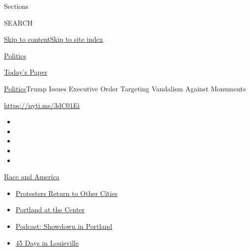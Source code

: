 Sections

SEARCH

\protect\hyperlink{site-content}{Skip to
content}\protect\hyperlink{site-index}{Skip to site index}

\href{https://www.nytimes.com/section/politics}{Politics}

\href{https://myaccount.nytimes.com/auth/login?response_type=cookie\&client_id=vi}{}

\href{https://www.nytimes.com/section/todayspaper}{Today's Paper}

\href{/section/politics}{Politics}\textbar{}Trump Issues Executive Order
Targeting Vandalism Against Monuments

\url{https://nyti.ms/3dC01Ei}

\begin{itemize}
\item
\item
\item
\item
\item
\end{itemize}

\href{https://www.nytimes.com/news-event/george-floyd-protests-minneapolis-new-york-los-angeles?action=click\&pgtype=Article\&state=default\&region=TOP_BANNER\&context=storylines_menu}{Race
and America}

\begin{itemize}
\tightlist
\item
  \href{https://www.nytimes.com/2020/07/26/us/protests-portland-seattle-trump.html?action=click\&pgtype=Article\&state=default\&region=TOP_BANNER\&context=storylines_menu}{Protesters
  Return to Other Cities}
\item
  \href{https://www.nytimes.com/2020/07/24/us/portland-oregon-protests-white-race.html?action=click\&pgtype=Article\&state=default\&region=TOP_BANNER\&context=storylines_menu}{Portland
  at the Center}
\item
  \href{https://www.nytimes.com/2020/07/23/podcasts/the-daily/portland-protests.html?action=click\&pgtype=Article\&state=default\&region=TOP_BANNER\&context=storylines_menu}{Podcast:
  Showdown in Portland}
\item
  \href{https://www.nytimes.com/interactive/2020/07/16/us/black-lives-matter-protests-louisville-breonna-taylor.html?action=click\&pgtype=Article\&state=default\&region=TOP_BANNER\&context=storylines_menu}{45
  Days in Louisville}
\end{itemize}

